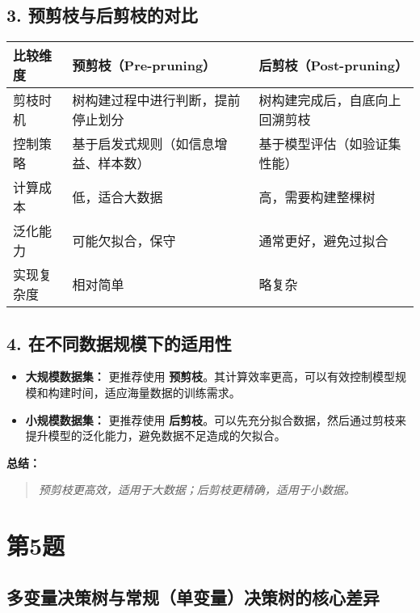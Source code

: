 \documentclass{article}
\begin{document}
\subsection*{3. 预剪枝与后剪枝的对比}

\begin{table}[h!]
\centering

\begin{tabular}{|m{4cm}|m{5cm}|m{5cm}|}
\hline
\textbf{比较维度} & \textbf{预剪枝（Pre-pruning）} & \textbf{后剪枝（Post-pruning）} \\
\hline
剪枝时机 & 树构建过程中进行判断，提前停止划分 & 树构建完成后，自底向上回溯剪枝 \\
\hline
控制策略 & 基于启发式规则（如信息增益、样本数） & 基于模型评估（如验证集性能） \\
\hline
计算成本 & 低，适合大数据 & 高，需要构建整棵树 \\
\hline
泛化能力 & 可能欠拟合，保守 & 通常更好，避免过拟合 \\
\hline
实现复杂度 & 相对简单 & 略复杂 \\
\hline
\end{tabular}
\end{table}

\subsection*{4. 在不同数据规模下的适用性}

\begin{itemize}
  \item \textbf{大规模数据集：} 更推荐使用 \textbf{预剪枝}。其计算效率更高，可以有效控制模型规模和构建时间，适应海量数据的训练需求。
  \item \textbf{小规模数据集：} 更推荐使用 \textbf{后剪枝}。可以先充分拟合数据，然后通过剪枝来提升模型的泛化能力，避免数据不足造成的欠拟合。
\end{itemize}

\textbf{总结：}
\begin{quote}
\emph{预剪枝更高效，适用于大数据；后剪枝更精确，适用于小数据。}
\end{quote}

\section*{第5题}

\subsection*{多变量决策树与常规（单变量）决策树的核心差异}
\end{document}

